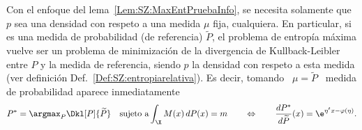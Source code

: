 %
Con el enfoque del lema~\ref{Lem:SZ:MaxEntPruebaInfo}, se necesita solamente que
$p$  sea una  densidad  con respeto  a  una medida  $\mu$  fija, cualquiera.  En
particular, si es una medida de probabilidad (de referencia) $\widetilde{P}$, el
problema de entrop\'ia  m\'axima vuelve ser un problema  de minimizaci\'on de la
divergencia de Kullback-Leibler entre $P$  y la medida de referencia, siendo $p$
la    densidad    con    respeto     a    esta    medida    (ver    definici\'on
Def.~\ref{Def:SZ:entropiarelativa}). Es decir, tomando \ $\mu = \widetilde{P}$ \
medida   de   probabilidad   aparece   inmediatamente
%
\[
P^* = \argmax_P \Dkl[P]{\widetilde{P}}  \quad \mbox{sujeto a}  \int_\X M(x)
\,  dP(x) =  m  \qquad \Leftrightarrow  \qquad \frac{dP^*}{d\widetilde{P}}(x)  =
\e^{\eta^t x - \varphi(\eta)}.
\]


\label{Ssec:SZ:EPI}

